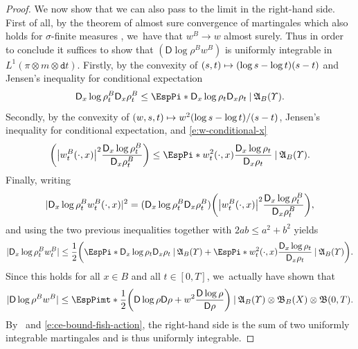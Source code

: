 \documentclass[10pt]{amsart}
\newcommand\mto{\mathchoice{\longmapsto}{\mapsto}{\mapsto}{\mapsto}}
\theoremstyle{definition}
\theoremstyle{remark}
\DeclarePairedDelimiter{\paren}{\lparen}{\rparen}
\DeclarePairedDelimiter{\abs}{\lvert}{\rvert}
\newcommand{\given}[1][]{%
\nonscript\:#1\vert
\allowbreak
\nonscript\:
\mathopen{}}
\begin{document}
\begin{proof}
We now show that we can also pass to the limit in the right-hand side.
First of all, by the theorem of almost sure convergence of martingales which also holds for $\sigma$-finite measures \cite[\S 41, p.\,37]{DellacherieMeyerMartingales}, we~have that $w^{B} \to w$ almost surely.
Thus in order to conclude it suffices to show that $(\mathsf{D} \log \rho^{B} w^{B})$ is uniformly integrable in $L^{1}(\pi \otimes m \otimes \mathtt{d} t)$.
Firstly, by the convexity of $(s, t) \mto (\log s - \log t)(s -t)$ and Jensen's inequality for conditional expectation
\begin{equation*}
\mathsf{D}_{x} \log \rho^{B}_{t} \mathsf{D}_{x} \rho^{B}_{t} \leq \EspPi*{ \mathsf{D}_{x} \log \rho_{t} \mathsf{D}_{x} \rho_{t} \given \mathfrak{A}_{B}(\varUpsilon)}.
\end{equation*}
Secondly, by the convexity of $(w, s, t) \mto w^{2} (\log s - \log t) / (s -t)$, Jensen's inequality for conditional expectation, and \cref{e:w-conditional-x}
\begin{equation*}
\paren*{ \abs*{w_{t}^{B}(\cdot, x)}^{2} \frac{\mathsf{D}_{x} \log \rho^{B}_{t}}{\mathsf{D}_{x} \rho^{B}_{t}} } \leq \EspPi*{ w_{t}^{2}(\cdot, x) \frac{\mathsf{D}_{x} \log \rho_{t}}{\mathsf{D}_{x} \rho_{t}} \given \mathfrak{A}_{B}(\varUpsilon) }.
\end{equation*}
Finally, writing
\begin{equation*}
\abs{ \mathsf{D}_{x} \log \rho_{t}^{B} w^{B}_{t}(\cdot, x) }^{2} = \paren{ \mathsf{D}_{x} \log \rho^{B}_{t} \mathsf{D}_{x} \rho_{t}^{B} } \paren*{ \abs*{w_{t}^{B}(\cdot, x)}^{2} \frac{\mathsf{D}_{x} \log \rho^{B}_{t}}{\mathsf{D}_{x} \rho^{B}_{t}} },
\end{equation*}
and using the two previous inequalities together with $2ab \leq a^{2} + b^{2}$ yields
\begin{equation*}
\abs{ \mathsf{D}_{x} \log \rho^{B}_{t} w^{B}_{t} } \leq \frac{1}{2} \paren*{ \EspPi*{ \mathsf{D}_{x} \log \rho_{t} \mathsf{D}_{x} \rho_{t} \given \mathfrak{A}_{B}(\varUpsilon) } + \EspPi*{ w_{t}^{2}(\cdot, x) \frac{\mathsf{D}_{x} \log \rho_{t}}{\mathsf{D}_{x} \rho_{t}} \given \mathfrak{A}_{B}(\varUpsilon) } }.
\end{equation*}
Since this holds for all $x \in B$ and all $t \in [0,T]$, we~actually have shown that
\begin{equation*}
\abs{ \mathsf{D} \log \rho^{B} w^{B} } \leq \EspPimt*{ \frac{1}{2} \paren*{ \mathsf{D} \log \rho \mathsf{D} \rho + w^{2} \frac{\mathsf{D} \log \rho}{\mathsf{D} \rho} } \given \mathfrak{A}_{B}(\varUpsilon) \otimes \mathfrak{B}_{B}(X) \otimes \mathfrak{B}(0,T) }.
\end{equation*}
By~\cite[Th.\,41.1, p.\,38]{DellacherieMeyerMartingales} and \cref{e:ce-bound-fish-action}, the right-hand side is the sum of two uniformly integrable martingales and is thus uniformly integrable.
\end{proof}
\end{document}
